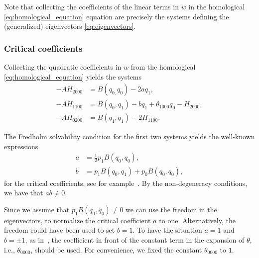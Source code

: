 Note that collecting the coefficients of the linear terms in $w$ in the
homological \cref{eq:homological_equation} equation are precisely the systems
defining the (generalized) eigenvectors \cref{eq:eigenvectors}. 


\subsubsection{Critical coefficients}%

Collecting the quadratic coefficients in $w$ from the homological
\cref{eq:homological_equation} yields the systems
%
\begin{align}
-AH_{2000} &= B(q_{0,}q_0) - 2aq_1, \label{eq:AH2000} \\
-AH_{1100} &= B(q_0,q_1) - bq_1 + \theta_{1000}q_0 - H_{2000},  \label{eq:AH1100} \\
-AH_{0200} &= B(q_1,q_1) - 2H_{1100}. \label{eq:AH0200} 
\end{align}

The Fredholm solvability condition for the first two systems yields the well-known expressions
\begin{align*}
a &= \frac12 p_1 B(q_0,q_0), \\
b &= p_1 B(q_0, q_1) + p_0 B(q_0, q_0),
\end{align*}
for the critical coefficients, see for example~\cite{Kuznetsov1999}. By the
non-degeneracy conditions, we have that $ab \neq 0$.

\begin{remark}
Since we assume that $p_1 B(q_0,q_0) \neq 0$ we can use the freedom in the
eigenvectors,
to normalize the critical coefficient
$a$ to one. %
Alternatively, the freedom could have been used to set $b=1$. To have the
situation $a=1$ and $b=\pm1$, as in~\cite{Broer1991}, the coefficient in front
of the constant term in the expansion of $\theta$, i.e., $\theta_{0000}$, should
be used. For convenience, we fixed the constant $\theta_{0000}$ to $1$.
\end{remark}

